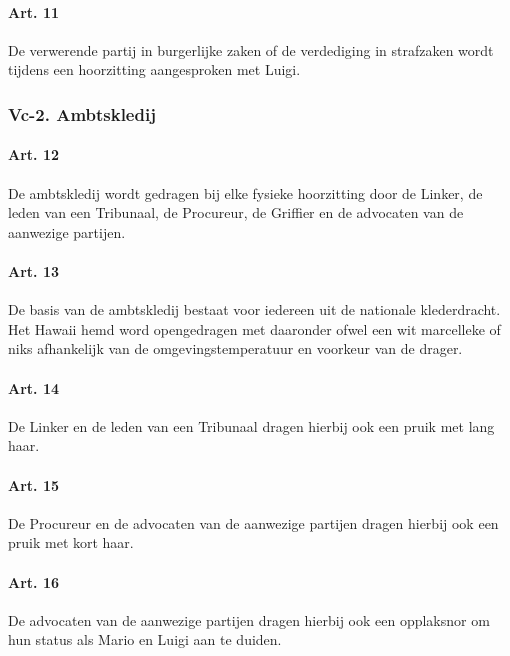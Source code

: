 \hypertarget{art.-11}{%
\paragraph{Art. 11}\label{art.-11}}

De verwerende partij in burgerlijke zaken of de verdediging in
strafzaken wordt tijdens een hoorzitting aangesproken met Luigi.

\hypertarget{vc-2.-ambtskledij}{%
\subsubsection{Vc-2. Ambtskledij}\label{vc-2.-ambtskledij}}

\hypertarget{art.-12}{%
\paragraph{Art. 12}\label{art.-12}}

De ambtskledij wordt gedragen bij elke fysieke hoorzitting door de
Linker, de leden van een Tribunaal, de Procureur, de Griffier en de
advocaten van de aanwezige partijen.

\hypertarget{art.-13}{%
\paragraph{Art. 13}\label{art.-13}}

De basis van de ambtskledij bestaat voor iedereen uit de nationale
klederdracht. Het Hawaii hemd word opengedragen met daaronder ofwel een
wit marcelleke of niks afhankelijk van de omgevingstemperatuur en
voorkeur van de drager.

\hypertarget{art.-14}{%
\paragraph{Art. 14}\label{art.-14}}

De Linker en de leden van een Tribunaal dragen hierbij ook een pruik met
lang haar.

\hypertarget{art.-15}{%
\paragraph{Art. 15}\label{art.-15}}

De Procureur en de advocaten van de aanwezige partijen dragen hierbij
ook een pruik met kort haar.

\hypertarget{art.-16}{%
\paragraph{Art. 16}\label{art.-16}}

De advocaten van de aanwezige partijen dragen hierbij ook een opplaksnor
om hun status als Mario en Luigi aan te duiden.
